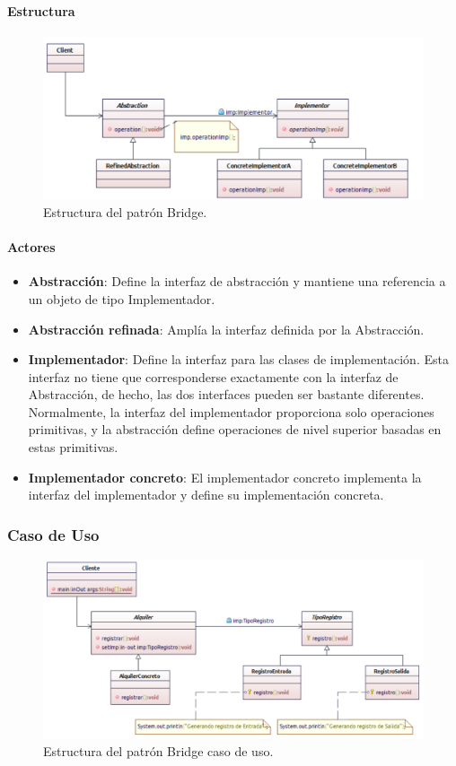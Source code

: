 \paragraph{Estructura}

\begin{figure}[th!]
	\centering
	\includegraphics[width=.7\linewidth]{imagenes/Patrones/Bridge.pdf}
	\caption{Estructura del patrón Bridge.\cite{gof}}	
\end{figure}

\paragraph{Actores}


\begin{itemize}
	\item \textbf{Abstracción}: Define la interfaz de abstracción y mantiene una referencia a un objeto de tipo Implementador.
	\item \textbf{Abstracción refinada}: Amplía la interfaz definida por la Abstracción.
	\item \textbf{Implementador}: Define la interfaz para las clases de implementación. Esta interfaz no tiene que corresponderse exactamente con la interfaz de Abstracción, de hecho, las dos interfaces pueden ser bastante diferentes. Normalmente, la interfaz del implementador proporciona solo operaciones primitivas, y la abstracción define operaciones de nivel superior basadas en estas primitivas.
	\item \textbf{Implementador concreto}: El implementador concreto implementa la interfaz del implementador y define su implementación concreta.
\end{itemize}


\subsubsection{Caso de Uso}
\begin{figure}[th!]
	\centering
	\includegraphics[width=.7\linewidth]{imagenes/Patrones/Bridge_caso.pdf}
	\caption{Estructura del patrón Bridge caso de uso.\cite{gof}}	
\end{figure}
